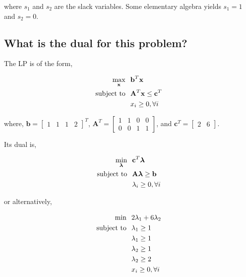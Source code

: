 \documentclass{article}
\begin{document}
\noindent where $s_1$ and $s_2$ are the slack variables. Some elementary algebra yields $s_1 = 1$ and $s_2 = 0$.

\subsection{What is the dual for this problem?}

The LP is of the form,

\begin{align*}
\max_\mathbf{x} & \hspace{0.1in} \mathbf{b}^T \mathbf{x}\\
\text{subject to} & \hspace{0.1in} \mathbf{A}^T \mathbf{x} \le \mathbf{c}^T\\
& \hspace{0.1in} x_i \ge 0, \forall i
\end{align*}

\noindent where, $\mathbf{b} = \begin{bmatrix}1 & 1 & 1 & 2\end{bmatrix}^T$, $\mathbf{A}^T = \left[\begin{smallmatrix}1 & 1 & 0 & 0\\0 & 0 & 1 & 1\end{smallmatrix}\right]$, and $\mathbf{c}^T = \begin{bmatrix} 2 & 6 \end{bmatrix}$.

Its dual is,

\begin{align*}
\min_{\boldsymbol{\lambda}} & \hspace{0.1in} \mathbf{c}^T \boldsymbol{\lambda}\\
\text{subject to} & \hspace{0.1in} \mathbf{A} \boldsymbol{\lambda} \ge \mathbf{b}\\
& \hspace{0.1in} \lambda_i \ge 0, \forall i
\end{align*}

or alternatively,

\begin{align*}
\text{min} & \hspace{0.1in} 2\lambda_1 + 6\lambda_2\\
\text{subject to} & \hspace{0.1in} \lambda_1 \ge 1\\
& \hspace{0.1in} \lambda_1 \ge 1\\
& \hspace{0.1in} \lambda_2 \ge 1\\
& \hspace{0.1in} \lambda_2 \ge 2\\
& \hspace{0.1in} x_i \ge 0, \forall i
\end{align*}
\end{document}

